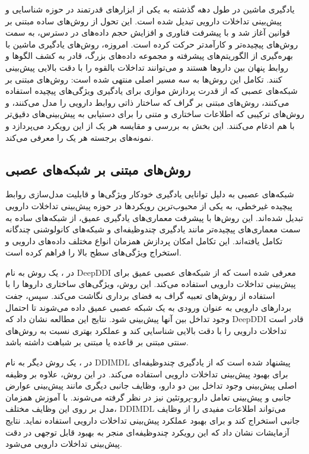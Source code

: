 یادگیری ماشین در طول دهه گذشته به یکی از ابزارهای قدرتمند در حوزه شناسایی و پیش‌بینی تداخلات دارویی تبدیل شده است. این تحول از روش‌های ساده مبتنی بر قوانین آغاز شد و با پیشرفت فناوری و افزایش حجم داده‌های در دسترس، به سمت روش‌های پیچیده‌تر و کارآمدتر حرکت کرده است. امروزه، روش‌های یادگیری ماشین با بهره‌گیری از الگوریتم‌های پیشرفته و مجموعه داده‌های بزرگ، قادر به کشف الگوها و روابط پنهان بین داروها هستند و می‌توانند تداخلات بالقوه را با دقت بالایی پیش‌بینی کنند. تکامل این روش‌ها به سه مسیر اصلی منتهی شده است: روش‌های مبتنی بر شبکه‌های عصبی که از قدرت پردازش موازی برای یادگیری ویژگی‌های پیچیده استفاده می‌کنند، روش‌های مبتنی بر گراف که ساختار ذاتی روابط دارویی را مدل می‌کنند، و روش‌های ترکیبی که اطلاعات ساختاری و متنی را برای دستیابی به پیش‌بینی‌های دقیق‌تر با هم ادغام می‌کنند. این بخش به بررسی و مقایسه هر یک از این رویکرد می‌پردازد و نمونه‌های برجسته هر یک را معرفی می‌کند.

\subsection{روش‌های مبتنی بر شبکه‌های عصبی}

شبکه‌های عصبی به دلیل توانایی یادگیری خودکار ویژگی‌ها و قابلیت مدل‌سازی روابط پیچیده غیرخطی، به یکی از محبوب‌ترین رویکردها در حوزه پیش‌بینی تداخلات دارویی تبدیل شده‌اند. این روش‌ها با پیشرفت معماری‌های یادگیری عمیق، از شبکه‌های ساده به سمت معماری‌های پیچیده‌تر مانند یادگیری چندوظیفه‌ای و شبکه‌های کانولوشنی چندگانه تکامل یافته‌اند. این تکامل امکان پردازش همزمان انواع مختلف داده‌های دارویی و استخراج ویژگی‌های سطح بالا را فراهم کرده است.

در \cite{ref_ryu2018}، یک روش به نام DeepDDI معرفی شده است که از شبکه‌های عصبی عمیق برای پیش‌بینی تداخلات دارویی استفاده می‌کند. این روش، ویژگی‌های ساختاری داروها را با استفاده از روش‌های تعبیه گراف به فضای برداری نگاشت می‌کند. سپس، جفت بردارهای دارویی به عنوان ورودی به یک شبکه عصبی عمیق داده می‌شوند تا احتمال وجود تداخل بین آنها پیش‌بینی شود. نتایج این مطالعه نشان داد که DeepDDI قادر است تداخلات دارویی را با دقت بالایی شناسایی کند و عملکرد بهتری نسبت به روش‌های سنتی مبتنی بر قاعده یا مبتنی بر شباهت داشته باشد.

در \cite{ref_deng2020}، یک روش دیگر به نام DDIMDL پیشنهاد شده است که از یادگیری چندوظیفه‌ای برای بهبود پیش‌بینی تداخلات دارویی استفاده می‌کند. در این روش، علاوه بر وظیفه اصلی پیش‌بینی وجود تداخل بین دو دارو، وظایف جانبی دیگری مانند پیش‌بینی عوارض جانبی و پیش‌بینی تعامل دارو-پروتئین نیز در نظر گرفته می‌شوند. با آموزش همزمان مدل بر روی این وظایف مختلف، DDIMDL می‌تواند اطلاعات مفیدی را از وظایف جانبی استخراج کند و برای بهبود عملکرد پیش‌بینی تداخلات دارویی استفاده نماید. نتایج آزمایشات نشان داد که این رویکرد چندوظیفه‌ای منجر به بهبود قابل توجهی در دقت پیش‌بینی تداخلات دارویی می‌شود.

